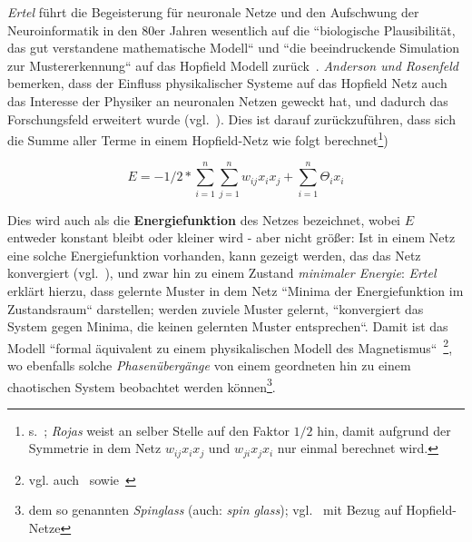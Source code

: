 \textit{Ertel} führt die Begeisterung für neuronale Netze und den Aufschwung der Neuroinformatik in den 80er Jahren wesentlich auf die ``biologische Plausibilität, das gut verstandene mathematische Modell`` und ``die beeindruckende Simulation zur Mustererkennung`` auf das Hopfield Modell zurück~\cite[297]{Ert21b}. \textit{Anderson und Rosenfeld} bemerken, dass der Einfluss physikalischer Systeme auf das Hopfield Netz auch das Interesse der Physiker an neuronalen Netzen geweckt hat, und dadurch das Forschungsfeld erweitert wurde (vgl.~\cite[458]{AR88}). Dies ist darauf zurückzuführen, dass sich die Summe aller Terme in einem Hopfield-Netz wie folgt berechnet\footnote{
    s.~\cite[287]{Roj93}; \textit{Rojas} weist an selber Stelle auf den Faktor $1/2$ hin, damit aufgrund der Symmetrie in dem Netz $w_{ij}x_ix_j$ und $w_{ji}x_jx_i$ nur einmal berechnet wird.
})

\begin{equation}
E = -1/2 * \sum^n_{i=1}\sum^n_{j=1} w_{ij}x_ix_j + \sum^n_{i=1}\Theta_ix_i
\label{eq:gl-energie}
\end{equation}

Dies wird auch als die \textbf{Energiefunktion} des Netzes bezeichnet, wobei $E$ entweder konstant bleibt oder kleiner wird - aber nicht größer: Ist in einem Netz eine solche Energiefunktion vorhanden, kann gezeigt werden, das das Netz konvergiert (vgl.~\cite[139]{Fau94}), und zwar hin zu einem Zustand \textit{minimaler Energie}: \textit{Ertel} erklärt hierzu, dass gelernte Muster in dem Netz ``Minima der Energiefunktion im Zustandsraum`` darstellen; werden zuviele Muster gelernt, ``konvergiert das System gegen Minima, die keinen gelernten Muster entsprechen``.
Damit ist das Modell ``formal äquivalent zu einem physikalischen Modell des Magnetismus``~\cite[293]{Ert21b}\footnote{
    vgl. auch~\cite[417]{AR98} sowie~\cite[2556 f.]{Hop82}
}, wo ebenfalls solche \textit{Phasenübergänge} von einem geordneten hin zu einem chaotischen System beobachtet werden können\footnote{
    dem so genannten \textit{Spinglass} (auch: \textit{spin glass}); vgl.~\cite[900]{BY86} mit Bezug auf Hopfield-Netze
}.\\

